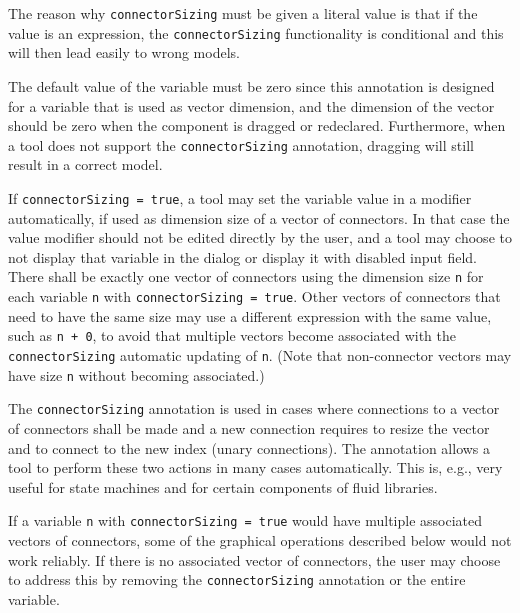 \begin{nonnormative}
The reason why \lstinline!connectorSizing! must be given a literal value is that if the value is an expression, the \lstinline!connectorSizing! functionality is conditional and this will then lead easily to wrong models.

The default value of the variable must be zero since this annotation is designed for a variable that is used as vector dimension, and the dimension of the vector should be zero when the component is dragged or redeclared.
Furthermore, when a tool does not support the \lstinline!connectorSizing! annotation, dragging will still result in a correct model.
\end{nonnormative}

If \lstinline!connectorSizing = true!, a tool may set the variable value in a modifier automatically, if used as dimension size of a vector of connectors.
In that case the value modifier should not be edited directly by the user, and a tool may choose to not display that variable in the dialog or display it with disabled input field.
There shall be exactly one vector of connectors using the dimension size \lstinline!n! for each variable \lstinline!n! with \lstinline!connectorSizing = true!.
Other vectors of connectors that need to have the same size may use a different expression with the same value, such as \lstinline!n + 0!, to avoid that multiple vectors become associated with the \lstinline!connectorSizing! automatic updating of \lstinline!n!.
(Note that non-connector vectors may have size \lstinline!n! without becoming associated.)

\begin{nonnormative}
The \lstinline!connectorSizing! annotation is used in cases where connections to a vector of connectors shall be made and a new connection requires to resize the vector and to connect to the new index (unary connections).
The annotation allows a tool to perform these two actions in many cases automatically.
This is, e.g., very useful for state machines and for certain components of fluid libraries.

If a variable \lstinline!n! with \lstinline!connectorSizing = true! would have multiple associated vectors of connectors, some of the graphical operations described below would not work reliably.
If there is no associated vector of connectors, the user may choose to address this by removing the \lstinline!connectorSizing! annotation or the entire variable.
\end{nonnormative}

